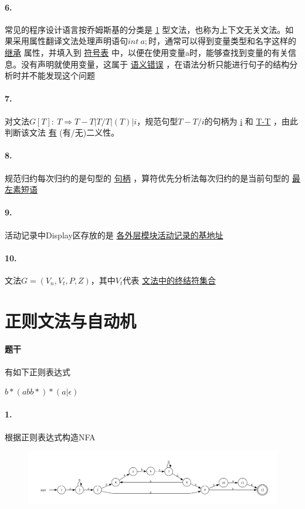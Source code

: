 \documentclass[UTF8]{ctexart} %
\begin{document}
\paragraph{6.} 常见的程序设计语言按乔姆斯基的分类是 \underline{1} 型文法，也称为上下文无关文法。如果采用属性翻译文法处理声明语句$int\ a;$时，通常可以得到变量类型和名字这样的 \underline{继承} 属性，并填入到 \underline{符号表} 中，以便在使用变量a时，能够查找到变量的有关信息。没有声明就使用变量，这属于 \underline{语义错误} ，在语法分析只能进行句子的结构分析时并不能发现这个问题

\paragraph{7.} 对文法$G[T]:\ T\Rightarrow T-T|T/T|(T)|i$，规范句型$T-T/i$的句柄为 \underline{i} 和 \underline{T-T} ，由此判断该文法 \underline{有} (有/无)二义性。

\paragraph{8.} 规范归约每次归约的是句型的 \underline{句柄} ，算符优先分析法每次归约的是当前句型的 \underline{最左素短语}

\paragraph{9.} 活动记录中Display区存放的是 \underline{各外层模块活动记录的基地址}

\paragraph{10.} 文法$G=(V_n,V_t,P,Z)$，其中$V_t$代表 \underline{文法中的终结符集合}

\section{正则文法与自动机}

\paragraph{题干} 有如下正则表达式

$b*(abb*)*(a|\epsilon)$

\paragraph{1.} 根据正则表达式构造NFA

\begin{figure}[H]
    \centering
    \includegraphics[width=\textwidth]{assets/nfa.pdf}
\end{figure}
\end{document}
